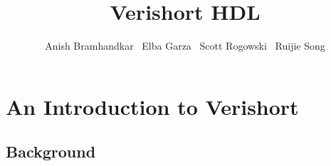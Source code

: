 \documentclass[letterpaper,11pt]{article}
\begin{document}
\title{Verishort HDL}
\author{Anish Bramhandkar \ Elba Garza \ Scott Rogowski \ Ruijie Song}
\renewcommand{\today}{December 22, 2010}
\maketitle

\newpage

\tableofcontents

\newpage

\section{An Introduction to Verishort}
    \subsection{Background}
    
\end{document}
